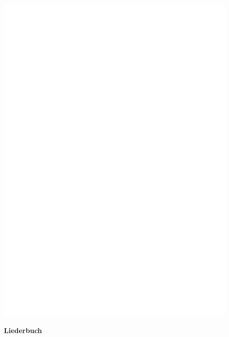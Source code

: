 
\vspace*{\fill}

\begin{center}
\color{white}
\includegraphics[width=0.9\textwidth]{covers/logo-black-text.pdf}

\sffamily
\Large
\textbf{Liederbuch}
\end{center}

\vspace*{\fill}

\pagebreak
\restorepagecolor
